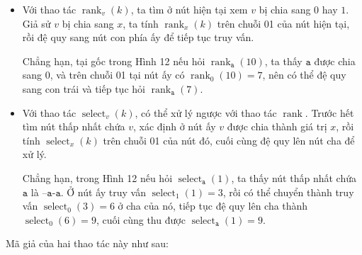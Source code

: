 \documentclass[11pt]{article}
\DeclareMathOperator{\rank}{rank}
\begin{document}
\begin{itemize}
  \item Với thao tác \(\rank_v(k)\), ta tìm ở nút hiện tại xem \(v\) bị chia
        sang \(0\) hay \(1\). Giả sử \(v\) bị chia sang \(x\), ta tính
        \(\rank_x(k)\) trên chuỗi 01 của nút hiện tại, rồi đệ quy sang nút con
        phía ấy để tiếp tục truy vấn.

        Chẳng hạn, tại gốc trong Hình 12 nếu hỏi \(\rank_{\texttt{a}}(10)\),
        ta thấy \(\texttt{a}\) được chia sang \(0\), và trên chuỗi 01 tại nút
        ấy có \(\rank_0(10)=7\), nên có thể đệ quy sang con trái và tiếp tục
        hỏi \(\rank_{\texttt{a}}(7)\).
  \item Với thao tác \(\operatorname{select}_v(k)\), có thể xử lý ngược với
        thao tác \(\rank\). Trước hết tìm nút thấp nhất chứa \(v\), xác định
        ở nút ấy \(v\) được chia thành giá trị \(x\), rồi tính
        \(\operatorname{select}_x(k)\) trên chuỗi 01 của nút đó, cuối cùng đệ
        quy lên nút cha để xử lý.

        Chẳng hạn, trong Hình 12 nếu hỏi \(\operatorname{select}_{\texttt{a}}(1)\),
        ta thấy nút thấp nhất chứa \(\texttt{a}\) là \(\texttt{--a-a}\). Ở nút
        ấy truy vấn \(\operatorname{select}_1(1)=3\), rồi có thể chuyển thành
        truy vấn \(\operatorname{select}_0(3)=6\) ở cha của nó, tiếp tục đệ
        quy lên cha thành \(\operatorname{select}_0(6)=9\), cuối cùng thu được
        \(\operatorname{select}_{\texttt{a}}(1)=9\).
\end{itemize}

Mã giả của hai thao tác này như sau:
\end{document}

